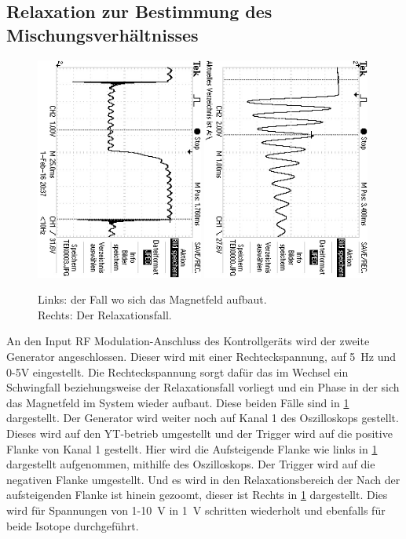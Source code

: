 \subsection{Relaxation zur Bestimmung des Mischungsverhältnisses}
\begin{figure}[h!]
	\centering
	\includegraphics[angle = 90 , clip , trim = 50mm 50mm 30mm 70mm, width =  0.49\textwidth , height = 0.3\textwidth]{../Grafiken/Resonanz_1_Exp_Anstieg_05V.jpg}	\includegraphics[angle = 90 , clip , trim = 45mm 40mm 30mm 30mm , width = 0.49\textwidth , height = 0.3\textwidth]{../Grafiken/Resonanz_1_Relaxation_4V.jpg}
	\caption{Links: der Fall wo sich das Magnetfeld aufbaut.\\ Rechts: Der Relaxationsfall.} \label{fig:Relaxation}
\end{figure}
An den Input RF Modulation-Anschluss des Kontrollgeräts wird der zweite Generator angeschlossen.
Dieser wird mit einer Rechteckspannung, auf \SI{5}{\hertz} und 0-5\si{\volt} eingestellt.
Die Rechteckspannung sorgt dafür das im Wechsel ein Schwingfall beziehungsweise der Relaxationsfall vorliegt und ein Phase in der sich das Magnetfeld im System wieder aufbaut. Diese beiden Fälle sind in \cref{fig:Relaxation} dargestellt.
Der Generator wird weiter noch auf Kanal 1 des Oszilloskops gestellt.
Dieses wird auf den YT-betrieb umgestellt und der Trigger wird auf die positive Flanke von Kanal 1 gestellt.
Hier wird die Aufsteigende Flanke wie links in \cref{fig:Relaxation} dargestellt aufgenommen, mithilfe des Oszilloskops.
Der Trigger wird auf die negativen Flanke umgestellt.
Und es wird in den Relaxationsbereich der Nach der aufsteigenden Flanke ist hinein gezoomt, dieser ist Rechts in \cref{fig:Relaxation} dargestellt.
Dies wird für Spannungen von 1-\SI{10}{\volt} in \SI{1}{\volt} schritten wiederholt und ebenfalls für beide Isotope durchgeführt.


